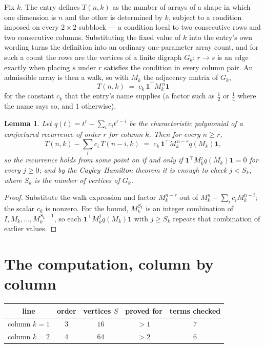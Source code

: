 \documentclass[11pt,a4paper]{article}
\theoremstyle{plain}
\newtheorem{lemma}[theorem]{Lemma}
\theoremstyle{definition}
\begin{document}
Fix $k$. The entry defines $T(n,k)$ as the number of arrays of a shape in which one dimension
is $n$ and the other is determined by $k$, subject to a condition imposed on every
$2\times2$ subblock --- a condition local to two consecutive rows and two consecutive columns.
Substituting the fixed value of $k$ into the entry's own wording turns the definition into an
ordinary one-parameter array count, and for such a count the rows are the vertices of a finite
digraph $G_k$: $r\to s$ is an edge exactly when placing $s$ under $r$ satisfies the condition
in every column pair. An admissible array is then a walk, so with $M_k$ the adjacency matrix
of $G_k$,
\[
T(n,k)\;=\;c_k\,\mathbf{1}^{\!\top}M_k^{\,n}\mathbf{1}
\]
for the constant $c_k$ that the entry's name supplies (a factor such as $\tfrac12$ or
$\tfrac14$ where the name says so, and $1$ otherwise).

\begin{lemma}\label{lem:crit}
Let $q(t)=t^{r}-\sum_i c_it^{r-i}$ be the characteristic polynomial of a conjectured
recurrence of order $r$ for column $k$. Then for every $n\ge r$,
\[
T(n,k)-\sum_i c_i\,T(n-i,k)\;=\;c_k\,\mathbf{1}^{\!\top}M_k^{\,n-r}q(M_k)\mathbf{1},
\]
so the recurrence holds from some point on if and only if
$\mathbf{1}^{\!\top}M_k^{j}q(M_k)\mathbf{1}=0$ for every $j\ge0$; and by the
Cayley--Hamilton theorem it is enough to check $j<S_k$, where $S_k$ is the number of vertices
of $G_k$.
\end{lemma}

\begin{proof}
Substitute the walk expression and factor $M_k^{n-r}$ out of $M_k^{n}-\sum_ic_iM_k^{n-i}$;
the scalar $c_k$ is nonzero. For the bound, $M_k^{S_k}$ is an integer combination of
$I,M_k,\dots,M_k^{S_k-1}$, so each $\mathbf{1}^{\!\top}M_k^{j}q(M_k)\mathbf{1}$ with
$j\ge S_k$ repeats that combination of earlier values.
\end{proof}

\section{The computation, column by column}

\begin{center}
\begin{tabular}{ccccc}
line & order & vertices $S$ & proved for & terms checked \\ \hline
column $k$$=1$ & $3$ & $16$ & $>1$ & $7$ \\
column $k$$=2$ & $4$ & $64$ & $>2$ & $6$ \\
\end{tabular}
\end{center}
\end{document}
